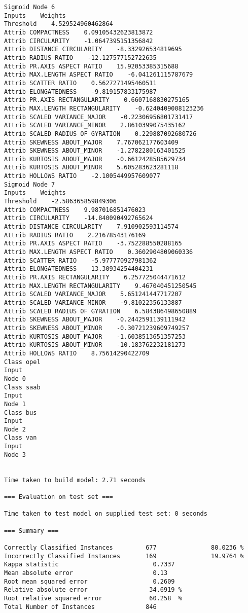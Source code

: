 \documentclass[
	article,			%
	11pt,				%
	oneside,			%
	a4paper,			%
	english,			%
	brazil,				%
	sumario=tradicional
	]{abntex2}
\begin{document}
\begin{lstlisting}
Sigmoid Node 6
Inputs    Weights
Threshold    4.529524960462864
Attrib COMPACTNESS    0.09105432623813872
Attrib CIRCULARITY    -1.0647395151356842
Attrib DISTANCE CIRCULARITY    -8.332926534819695
Attrib RADIUS RATIO    -12.127577152722635
Attrib PR.AXIS ASPECT RATIO    15.92053385315688
Attrib MAX.LENGTH ASPECT RATIO    -6.041261115787679
Attrib SCATTER RATIO    0.5627271495460511
Attrib ELONGATEDNESS    -9.819157833175987
Attrib PR.AXIS RECTANGULARITY    0.6607168830275165
Attrib MAX.LENGTH RECTANGULARITY    -0.6240409008123236
Attrib SCALED VARIANCE_MAJOR    -0.22306956801731417
Attrib SCALED VARIANCE_MINOR    2.8610399075435162
Attrib SCALED RADIUS OF GYRATION    0.229887092680726
Attrib SKEWNESS ABOUT_MAJOR    7.767062177603409
Attrib SKEWNESS ABOUT_MINOR    -1.2782280163401525
Attrib KURTOSIS ABOUT_MAJOR    -0.6612428585629734
Attrib KURTOSIS ABOUT_MINOR    5.605283623281118
Attrib HOLLOWS RATIO    -2.1005449957609077
Sigmoid Node 7
Inputs    Weights
Threshold    -2.586365859849306
Attrib COMPACTNESS    9.987016851476023
Attrib CIRCULARITY    -14.840090492765624
Attrib DISTANCE CIRCULARITY    7.910902593114574
Attrib RADIUS RATIO    2.21678543176169
Attrib PR.AXIS ASPECT RATIO    -3.752288550288165
Attrib MAX.LENGTH ASPECT RATIO    0.3602904809060336
Attrib SCATTER RATIO    -5.977770927981362
Attrib ELONGATEDNESS    13.30934254404231
Attrib PR.AXIS RECTANGULARITY    6.257725044471612
Attrib MAX.LENGTH RECTANGULARITY    9.467040451250545
Attrib SCALED VARIANCE_MAJOR    5.651241447717207
Attrib SCALED VARIANCE_MINOR    -9.81022356133887
Attrib SCALED RADIUS OF GYRATION    6.584386498650889
Attrib SKEWNESS ABOUT_MAJOR    -0.2442591139111942
Attrib SKEWNESS ABOUT_MINOR    -0.30721239609749257
Attrib KURTOSIS ABOUT_MAJOR    -1.6038513651357253
Attrib KURTOSIS ABOUT_MINOR    -10.183762232181273
Attrib HOLLOWS RATIO    8.75614290422709
Class opel
Input
Node 0
Class saab
Input
Node 1
Class bus
Input
Node 2
Class van
Input
Node 3


Time taken to build model: 2.71 seconds

=== Evaluation on test set ===

Time taken to test model on supplied test set: 0 seconds

=== Summary ===

Correctly Classified Instances         677               80.0236 %
Incorrectly Classified Instances       169               19.9764 %
Kappa statistic                          0.7337
Mean absolute error                      0.13  
Root mean squared error                  0.2609
Relative absolute error                 34.6919 %
Root relative squared error             60.258  %
Total Number of Instances              846     


\end{lstlisting}
\end{document}

